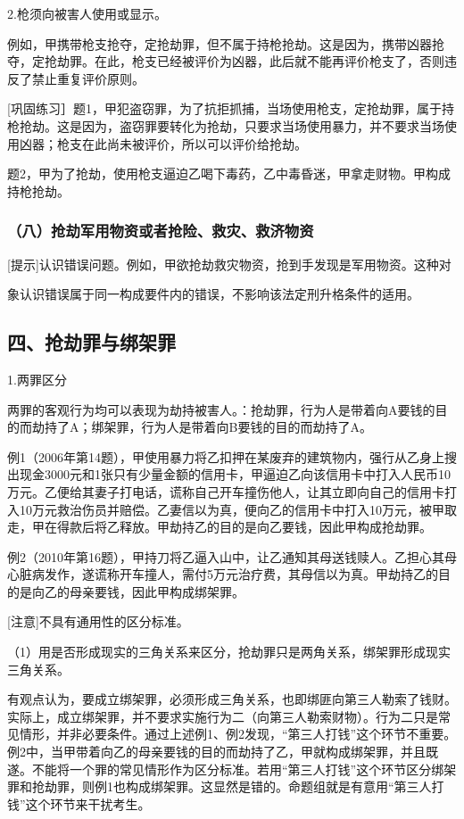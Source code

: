 2.枪须向被害人使用或显示。

例如，甲携带枪支抢夺，定抢劫罪，但不属于持枪抢劫。这是因为，携带凶器抢夺，定抢劫罪。在此，枪支已经被评价为凶器，此后就不能再评价枪支了，否则违反了禁止重复评价原则。

[巩固练习］题1，甲犯盗窃罪，为了抗拒抓捕，当场使用枪支，定抢劫罪，属于持枪抢劫。这是因为，盗窃罪要转化为抢劫，只要求当场使用暴力，并不要求当场使用凶器；枪支在此尚未被评价，所以可以评价给抢劫。

题2，甲为了抢劫，使用枪支逼迫乙喝下毒药，乙中毒昏迷，甲拿走财物。甲构成持枪抢劫。

\subsubsection*{（八）抢劫军用物资或者抢险、救灾、救济物资}

[提示]认识错误问题。例如，甲欲抢劫救灾物资，抢到手发现是军用物资。这种对

象认识错误属于同一构成要件内的错误，不影响该法定刑升格条件的适用。

\subsection*{四、抢劫罪与绑架罪}

1.两罪区分

两罪的客观行为均可以表现为劫持被害人。：抢劫罪，行为人是带着向A要钱的目的而劫持了A；绑架罪，行为人是带着向B要钱的目的而劫持了A。

例1（2006年第14题），甲使用暴力将乙扣押在某废弃的建筑物内，强行从乙身上搜出现金3000元和1张只有少量金额的信用卡，甲逼迫乙向该信用卡中打入人民币10万元。乙便给其妻子打电话，谎称自己开车撞伤他人，让其立即向自己的信用卡打入10万元救治伤员并赔偿。乙妻信以为真，便向乙的信用卡中打入10万元，被甲取走，甲在得款后将乙释放。甲劫持乙的目的是向乙要钱，因此甲构成抢劫罪。

例2（2010年第16题），甲持刀将乙逼入山中，让乙通知其母送钱赎人。乙担心其母心脏病发作，遂谎称开车撞人，需付5万元治疗费，其母信以为真。甲劫持乙的目的是向乙的母亲要钱，因此甲构成绑架罪。

[注意]不具有通用性的区分标准。

（1）用是否形成现实的三角关系来区分，抢劫罪只是两角关系，绑架罪形成现实三角关系。

有观点认为，要成立绑架罪，必须形成三角关系，也即绑匪向第三人勒索了钱财。实际上，成立绑架罪，并不要求实施行为二（向第三人勒索财物）。行为二只是常见情形，并非必要条件。通过上述例1、例2发现，“第三人打钱”这个环节不重要。例2中，当甲带着向乙的母亲要钱的目的而劫持了乙，甲就构成绑架罪，并且既遂。不能将一个罪的常见情形作为区分标准。若用“第三人打钱”这个环节区分绑架罪和抢劫罪，则例1也构成绑架罪。这显然是错的。命题组就是有意用“第三人打钱”这个环节来干扰考生。

